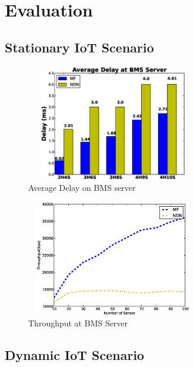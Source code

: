 \section{Evaluation}
\subsection{Stationary IoT Scenario}
\begin{figure}
\includegraphics[width=3.00in,height=2.00in]{ave_delay_server.eps}
\caption{Average Delay on BMS server}
\end{figure}
\begin{figure}
\includegraphics[width=3.00in,height=2.00in]{throughput_ndn_mf.eps}
\caption{Throughput at BMS Server}
\end{figure}

\subsection{Dynamic IoT Scenario}
